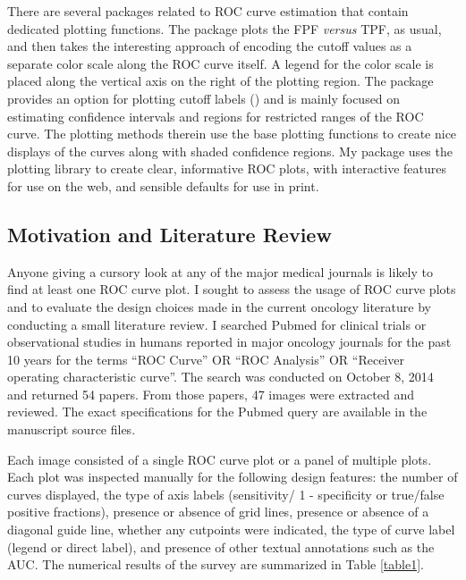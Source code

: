\documentclass[codesnippet]{jss}
\begin{document}
There are several  packages related to ROC curve estimation
that contain dedicated plotting functions. The  package
\citep{rocr} plots the FPF \emph{versus} TPF, as usual, and then takes
the interesting approach of encoding the cutoff values as a separate
color scale along the ROC curve itself. A legend for the color scale is
placed along the vertical axis on the right of the plotting region. The
 package \citep{pROC} provides an option for plotting cutoff
labels () and is mainly focused on estimating
confidence intervals and regions for restricted ranges of the ROC curve.
The plotting methods therein use the base  plotting
functions to create nice displays of the curves along with shaded
confidence regions. My  package uses the 
\citep{ggplot2} plotting library to create clear, informative ROC plots,
with interactive features for use on the web, and sensible defaults for
use in print.

\subsection{Motivation and Literature
Review}\label{motivation-and-literature-review}

Anyone giving a cursory look at any of the major medical journals is
likely to find at least one ROC curve plot. I sought to assess the usage
of ROC curve plots and to evaluate the design choices made in the
current oncology literature by conducting a small literature review. I
searched Pubmed for clinical trials or observational studies in humans
reported in major oncology journals for the past 10 years for the terms
``ROC Curve'' OR ``ROC Analysis'' OR ``Receiver operating characteristic
curve''. The search was conducted on October 8, 2014 and returned 54
papers. From those papers, 47 images were extracted and reviewed. The
exact specifications for the Pubmed query are available in the
manuscript source files.

Each image consisted of a single ROC curve plot or a panel of multiple
plots. Each plot was inspected manually for the following design
features: the number of curves displayed, the type of axis labels
(sensitivity/ 1 - specificity or true/false positive fractions),
presence or absence of grid lines, presence or absence of a diagonal
guide line, whether any cutpoints were indicated, the type of curve
label (legend or direct label), and presence of other textual
annotations such as the AUC. The numerical results of the survey are
summarized in Table \ref{table1}.
\end{document}
